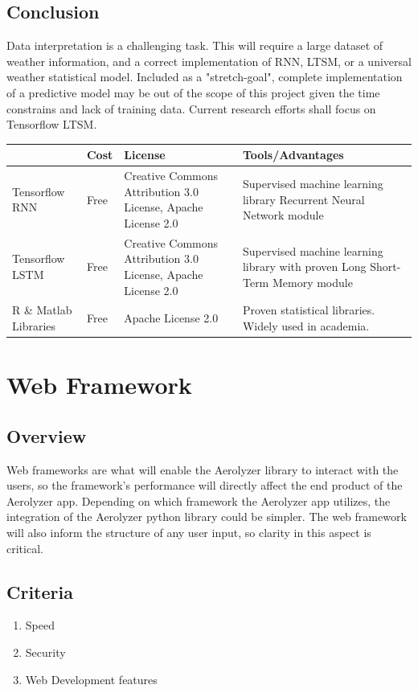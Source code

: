\documentclass[onecolumn, draftclsnofoot,10pt, compsoc]{IEEEtran}
\begin{document}
\begin{singlespace}
	\subsection{Conclusion}
		Data interpretation is a challenging task.
		This will require a large dataset of weather information, and a correct implementation of RNN, LTSM, or a universal weather statistical model.
		Included as a "stretch-goal", complete implementation of a predictive model may be out of the scope of this project given the time constrains and lack of training data.
		Current research efforts shall focus on Tensorflow LTSM.
		\begin{center}
			\begin{tabular}{|l|p{3cm}|p{5cm}|p{5cm}|}
				\hline \textbf{} & \textbf{Cost} & \textbf{License} & \textbf{Tools/Advantages} \\\hline
				Tensorflow RNN & Free & Creative Commons Attribution 3.0 License, Apache License 2.0 & Supervised machine learning library Recurrent Neural Network module\\\hline
				Tensorflow LSTM& Free & Creative Commons Attribution 3.0 License, Apache License 2.0 & Supervised machine learning library with proven Long Short-Term Memory module\\\hline
				R \& Matlab Libraries & Free & Apache License 2.0 & Proven statistical libraries. Widely used in academia.\\\hline
			\end{tabular}
		\end{center}

\section{Web Framework}
\subsection{Overview}
Web frameworks are what will enable the Aerolyzer library to interact with the users, so the framework's performance will directly affect the end product of the Aerolyzer app. Depending on which framework the Aerolyzer app utilizes, the integration of the Aerolyzer python library could be simpler. The web framework will also inform the structure of any user input, so clarity in this aspect is critical.
\subsection{Criteria}
\begin{enumerate}
	\item Speed
	\item Security
	\item Web Development features
\end{enumerate}

\end{singlespace}
\end{document}

